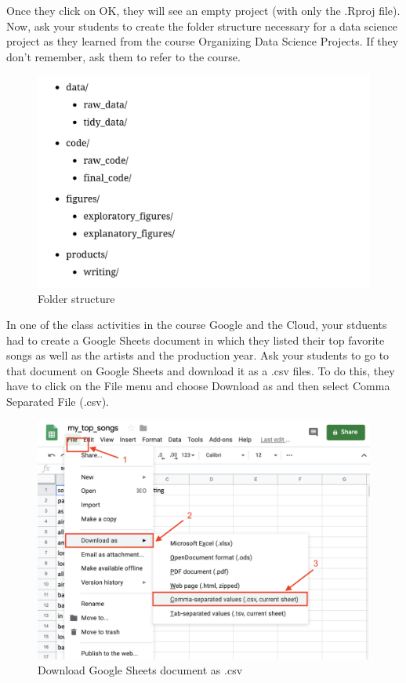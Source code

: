 \documentclass[]{book}
\begin{document}
Once they click on OK, they will see an empty project (with only the .Rproj file). Now, ask your students to create the folder structure necessary for a data science project as they learned from the course Organizing Data Science Projects. If they don't remember, ask them to refer to the course.

\begin{figure}
\centering
\includegraphics{./images/folder_structure.png}
\caption{Folder structure}
\end{figure}

In one of the class activities in the course Google and the Cloud, your stduents had to create a Google Sheets document in which they listed their top favorite songs as well as the artists and the production year. Ask your students to go to that document on Google Sheets and download it as a .csv files. To do this, they have to click on the File menu and choose Download as and then select Comma Separated File (.csv).

\begin{figure}
\centering
\includegraphics{./images/download_as_csv.png}
\caption{Download Google Sheets document as .csv}
\end{figure}
\end{document}
